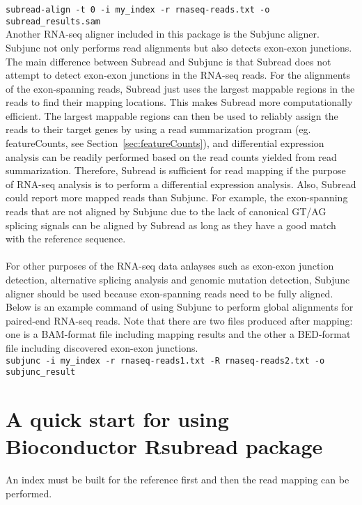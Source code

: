 \documentclass[12pt]{report}
\newcommand{\code}[1]{{\small\texttt{#1}}}
\newcommand{\Subread}{\textsf{Subread}}
\newcommand{\Subjunc}{\textsf{Subjunc}}
\newcommand{\Rsubread}{\textsf{Rsubread}}
\newcommand{\featureCounts}{\textsf{featureCounts}}
\begin{document}
\code{subread-align -t 0 -i my\_index -r rnaseq-reads.txt -o subread\_results.sam}\\

\noindent Another RNA-seq aligner included in this package is the {\Subjunc} aligner.
{\Subjunc} not only performs read alignments but also detects exon-exon junctions.
The main difference between {\Subread} and {\Subjunc} is that {\Subread} does not attempt to detect exon-exon junctions in the RNA-seq reads.
For the alignments of the exon-spanning reads, {\Subread} just uses the largest mappable regions in the reads to find their mapping locations.
This makes {\Subread} more computationally efficient.
The largest mappable regions can then be used to reliably assign the reads to their target genes by using a read summarization program (eg. \featureCounts, see Section~\ref{sec:featureCounts}), and differential expression analysis can be readily performed based on the read counts yielded from read summarization.
Therefore, {\Subread} is sufficient for read mapping if the purpose of RNA-seq analysis is to perform a differential expression analysis. 
Also, {\Subread} could report more mapped reads than {\Subjunc}.
For example, the exon-spanning reads that are not aligned by {\Subjunc} due to the lack of canonical GT/AG splicing signals can be aligned by {\Subread} as long as they have a good match with the reference sequence.\\

\noindent{{\Subjunc}}\\

For other purposes of the RNA-seq data anlayses such as exon-exon junction detection, alternative splicing analysis and genomic mutation detection, {\Subjunc} aligner should be used because exon-spanning reads need to be fully aligned.
Below is an example command of using {\Subjunc} to perform global alignments for paired-end RNA-seq reads.
Note that there are two files produced after mapping: one is a BAM-format file including mapping results and the other a BED-format file including discovered exon-exon junctions.\\

\code{subjunc -i my\_index -r rnaseq-reads1.txt -R rnaseq-reads2.txt -o subjunc\_result}

\section{A quick start for using Bioconductor {\Rsubread} package}

An index must be built for the reference first and then the read mapping can be performed.\\
\end{document}
